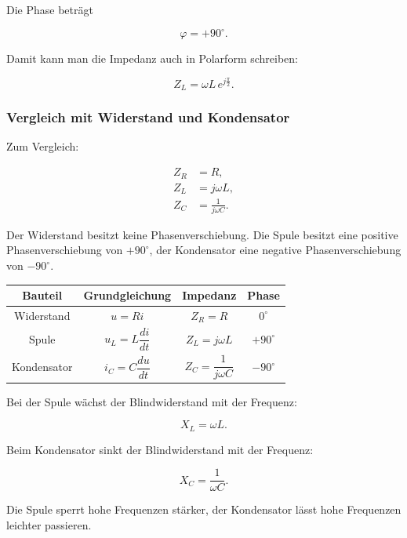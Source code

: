 Die Phase beträgt

\begin{equation}
	\varphi = +90^\circ.
	\label{eq:phase-impedanz-spule}
\end{equation}

Damit kann man die Impedanz auch in Polarform schreiben:

\begin{equation}
	Z_L = \omega L \, e^{j\frac{\pi}{2}}.
	\label{eq:spule-impedanz-polarform}
\end{equation}

\subsubsection{Vergleich mit Widerstand und Kondensator}
\label{subsubsec:vergleich-r-l-c-impedanzen}

Zum Vergleich:

\begin{align}
	Z_R &= R,
	\label{eq:impedanz-widerstand-vergleich} \\[4pt]
	Z_L &= j\omega L,
	\label{eq:impedanz-spule-vergleich} \\[4pt]
	Z_C &= \frac{1}{j\omega C}.
	\label{eq:impedanz-kondensator-vergleich}
\end{align}

Der Widerstand besitzt keine Phasenverschiebung. Die Spule besitzt eine
positive Phasenverschiebung von \(+90^\circ\), der Kondensator eine negative
Phasenverschiebung von \(-90^\circ\).

\begin{center}
	\begin{tabular}{c|c|c|c}
		Bauteil & Grundgleichung & Impedanz & Phase \\ \hline
		Widerstand & \(u = Ri\) & \(Z_R = R\) & \(0^\circ\) \\
		Spule & \(u_L = L\dfrac{di}{dt}\) & \(Z_L = j\omega L\) & \(+90^\circ\) \\
		Kondensator & \(i_C = C\dfrac{du}{dt}\) & \(Z_C = \dfrac{1}{j\omega C}\) & \(-90^\circ\)
	\end{tabular}
\end{center}

\begin{DidacticBox}
	\label{box:spule-kondensator-vergleich}
	Bei der Spule wächst der Blindwiderstand mit der Frequenz:
	
	\[
	X_L = \omega L.
	\]
	
	Beim Kondensator sinkt der Blindwiderstand mit der Frequenz:
	
	\[
	X_C = \frac{1}{\omega C}.
	\]
	
	Die Spule sperrt hohe Frequenzen stärker, der Kondensator lässt hohe
	Frequenzen leichter passieren.
\end{DidacticBox}

